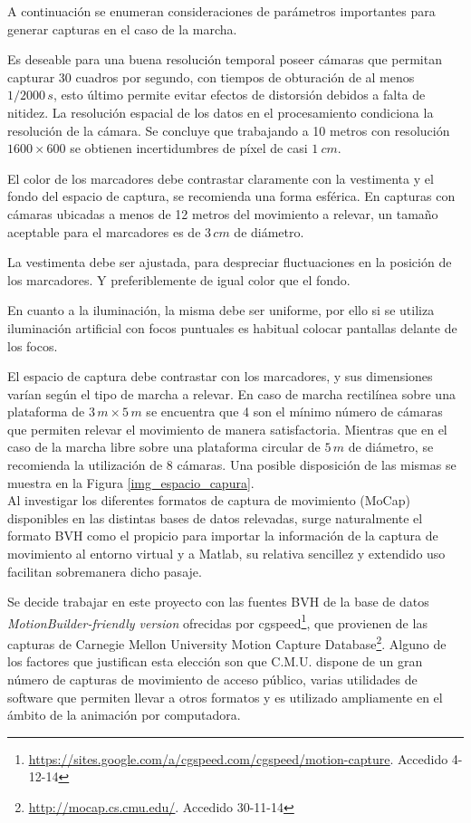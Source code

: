 A continuación se enumeran consideraciones de parámetros importantes para generar capturas en el caso de la marcha.

Es deseable para una buena resolución temporal poseer cámaras que permitan capturar 30 cuadros por segundo, con tiempos de obturación de al menos $1/2000\, s$, esto último permite evitar efectos de distorsión debidos a falta de nitidez. La resolución espacial de los datos en el procesamiento condiciona la resolución de la cámara. Se concluye que trabajando a 10 metros con resolución $1600\times600$ se obtienen incertidumbres de píxel de casi $1 ~cm $. 


El color de los  marcadores debe contrastar claramente con la vestimenta y el fondo del espacio de captura, se recomienda una forma esférica. En capturas con cámaras ubicadas a menos de 12 metros del movimiento a relevar, un tamaño aceptable para el marcadores es de $3\,cm$ de diámetro.

La vestimenta debe ser ajustada, para despreciar fluctuaciones en la posición de los marcadores. Y preferiblemente de igual color que el fondo.  

En cuanto a la iluminación, la misma debe ser uniforme, por ello si se utiliza iluminación artificial con focos puntuales es habitual colocar pantallas delante de los focos.

El espacio de captura debe contrastar con los marcadores, y sus dimensiones varían según el tipo de marcha a relevar. En caso de marcha rectilínea sobre una plataforma de $3\,m \times 5 \,m$ se encuentra que 4 son el mínimo número de cámaras que permiten relevar el movimiento de manera satisfactoria. Mientras  que en el caso de la marcha libre sobre una plataforma circular de $5\,m$ de diámetro, se recomienda la utilización de 8 cámaras. Una posible disposición de las mismas se muestra en la Figura \ref{img_espacio_capura}. \\

Al investigar los diferentes formatos de captura de movimiento (MoCap) disponibles en las distintas bases de datos relevadas, surge naturalmente el formato BVH como el propicio para importar la información de la captura de movimiento al entorno virtual y a Matlab, su relativa sencillez y extendido uso facilitan sobremanera dicho pasaje. 

Se decide trabajar en este proyecto con las fuentes BVH de la base de datos \textit{MotionBuilder-friendly version} ofrecidas por cgspeed\footnote{\textcolor{blue}{\underline{\url{https://sites.google.com/a/cgspeed.com/cgspeed/motion-capture}}}. Accedido 4-12-14},
 que provienen de las capturas de Carnegie Mellon University Motion Capture Database\footnote{\textcolor{blue}{\underline{\url{http://mocap.cs.cmu.edu/}}}. Accedido 30-11-14}. Alguno de los factores que justifican esta elección son que C.M.U. dispone de un gran número de capturas de movimiento de acceso público, varias utilidades de software que permiten llevar a otros formatos y es utilizado ampliamente en el ámbito de la animación por computadora.
 
